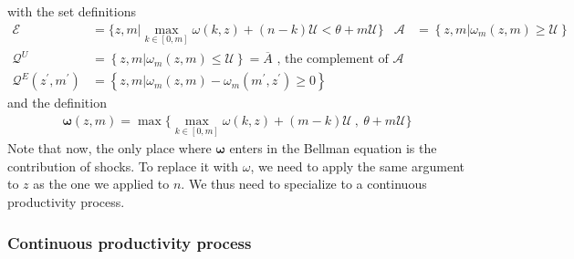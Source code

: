 with the set definitions
\begin{align*}
\mathcal{E} & =\Bigg\{ z,m\Bigg| \max_{k \in [0,m]} \omega(k,z) + (n-k)
\mathcal{U} < \theta + m \mathcal{U} \Bigg\} &
\mathcal{A}& =\left\{ z,m\Bigg| \omega_m(z,m) \geq \mathcal{U}\right\} \\
\mathcal{Q}^U & =\left\{ z,m\Bigg| \omega_m(z,m) \leq \mathcal{U}\right\} =
\overline{A} \text{ , the complement of $\mathcal{A}$} \\
\mathcal{Q}^{E}\left( z^\prime,m^{\prime }\right) & =\left\{ z,m\Bigg|\omega_m(z,m)
-  \omega_m(m^{\prime},z^{\prime}) \geq 0\right\}
\end{align*}%
and the definition
\begin{eqnarray*}
\pmb{\omega}(z,m) = \max \Bigg\{ \max_{k\in [0,m]} \omega(k,z) + (m-k)%
\mathcal{U} \ , \ \theta + m\mathcal{U} \Bigg\}
\end{eqnarray*}
Note that now, the only place where $\pmb{\omega}$ enters in the Bellman
equation is the contribution of shocks. To replace it with $\omega$, we need
to apply the same argument to $z$ as the one we applied to $n$. We thus need
to specialize to a continuous productivity process.

\subsubsection{Continuous productivity process}

